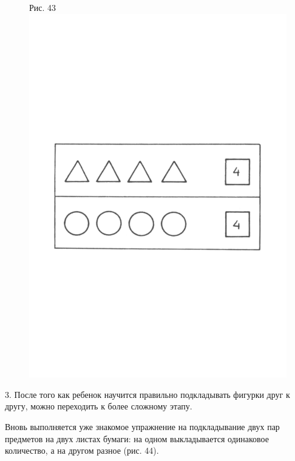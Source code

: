 \documentclass[a5paper]{book}
\begin{document}
\begin{figure}
\centering
Рис. 43\includegraphics[width=\linewidth]{media/media/image39.png}
\end{figure}

3. После того как ребенок научится правильно подкладывать фигурки друг к
другу, можно переходить к более сложному этапу.

Вновь выполняется уже знакомое упражнение на подкладывание двух пар
предметов на двух листах бумаги: на одном выкладывается одинаковое
количество, а на другом разное (рис. 44).
\end{document}
